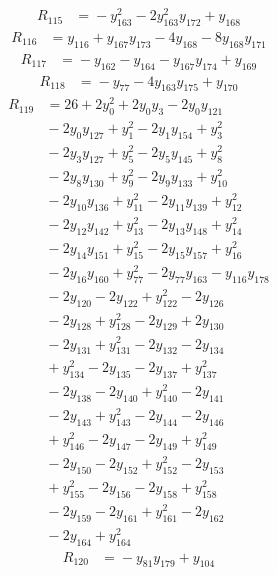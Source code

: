 \begin{align*}
R_{115} &={} -y_{163}^{2} -2y_{163}^{2}y_{172} +y_{168}
\end{align*}
\begin{align*}
R_{116} &={} y_{116} +y_{167}y_{173} -4y_{168} -8y_{168}y_{171}
\end{align*}
\begin{align*}
R_{117} &={} -y_{162} -y_{164} -y_{167}y_{174} +y_{169}
\end{align*}
\begin{align*}
R_{118} &={} -y_{77} -4y_{163}y_{175} +y_{170}
\end{align*}
\begin{align*}
R_{119} &={} 26 +2y_{0}^{2} +2y_{0}y_{3} -2y_{0}y_{121} \\
 &{} -2y_{0}y_{127} +y_{1}^{2} -2y_{1}y_{154} +y_{3}^{2} \\
 &{} -2y_{3}y_{127} +y_{5}^{2} -2y_{5}y_{145} +y_{8}^{2} \\
 &{} -2y_{8}y_{130} +y_{9}^{2} -2y_{9}y_{133} +y_{10}^{2} \\
 &{} -2y_{10}y_{136} +y_{11}^{2} -2y_{11}y_{139} +y_{12}^{2} \\
 &{} -2y_{12}y_{142} +y_{13}^{2} -2y_{13}y_{148} +y_{14}^{2} \\
 &{} -2y_{14}y_{151} +y_{15}^{2} -2y_{15}y_{157} +y_{16}^{2} \\
 &{} -2y_{16}y_{160} +y_{77}^{2} -2y_{77}y_{163} -y_{116}y_{178} \\
 &{} -2y_{120} -2y_{122} +y_{122}^{2} -2y_{126} \\
 &{} -2y_{128} +y_{128}^{2} -2y_{129} +2y_{130} \\
 &{} -2y_{131} +y_{131}^{2} -2y_{132} -2y_{134} \\
 &{} +y_{134}^{2} -2y_{135} -2y_{137} +y_{137}^{2} \\
 &{} -2y_{138} -2y_{140} +y_{140}^{2} -2y_{141} \\
 &{} -2y_{143} +y_{143}^{2} -2y_{144} -2y_{146} \\
 &{} +y_{146}^{2} -2y_{147} -2y_{149} +y_{149}^{2} \\
 &{} -2y_{150} -2y_{152} +y_{152}^{2} -2y_{153} \\
 &{} +y_{155}^{2} -2y_{156} -2y_{158} +y_{158}^{2} \\
 &{} -2y_{159} -2y_{161} +y_{161}^{2} -2y_{162} \\
 &{} -2y_{164} +y_{164}^{2}
\end{align*}
\begin{align*}
R_{120} &={} -y_{81}y_{179} +y_{104}
\end{align*}
